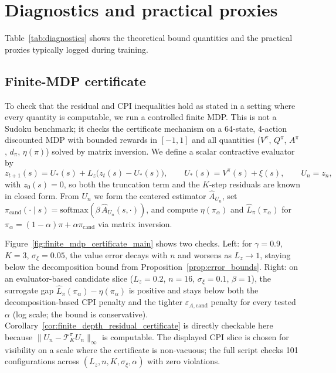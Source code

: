 \documentclass{article}
\theoremstyle{plain}
\theoremstyle{definition}
\theoremstyle{remark}
\begin{document}
\section{Diagnostics and practical proxies}
\label{app:diagnostics}

Table~\ref{tab:diagnostics} shows the theoretical bound quantities and the practical proxies typically logged during training.

\subsection{Finite-MDP certificate}
\label{app:finite_mdp_certificate}

To check that the residual and CPI inequalities hold as stated in a setting where every quantity is computable, we run a controlled finite MDP. This is not a Sudoku benchmark; it checks the certificate mechanism on a 64-state, 4-action discounted MDP with bounded rewards in $[-1,1]$ and all quantities ($V^\pi$, $Q^\pi$, $A^\pi$, $d_\pi$, $\eta(\pi)$) solved by matrix inversion. We define a scalar contractive evaluator by
\[
z_{t+1}(s)=U_*(s)+L_z\bigl(z_t(s)-U_*(s)\bigr),
\qquad
U_*(s)=V^\pi(s)+\xi(s),
\qquad
U_n=z_n,
\]
with $z_0(s)=0$, so both the truncation term and the $K$-step residuals are known in closed form. From $U_n$ we form the centered estimator $\widehat A_{U_n}$, set $\pi_{\mathrm{cand}}(\cdot\mid s)=\mathrm{softmax}(\beta\,\widehat A_{U_n}(s,\cdot))$, and compute $\eta(\pi_\alpha)$ and $\widehat L_\pi(\pi_\alpha)$ for $\pi_\alpha=(1-\alpha)\pi+\alpha\pi_{\mathrm{cand}}$ via matrix inversion.

Figure~\ref{fig:finite_mdp_certificate_main} shows two checks. Left: for $\gamma{=}0.9$, $K{=}3$, $\sigma_\xi{=}0.05$, the value error decays with $n$ and worsens as $L_z\to 1$, staying below the decomposition bound from Proposition~\ref{prop:error_bounds}. Right: on an evaluator-based candidate slice ($L_z{=}0.2$, $n{=}16$, $\sigma_\xi{=}0.1$, $\beta{=}1$), the surrogate gap $\widehat L_\pi(\pi_\alpha)-\eta(\pi_\alpha)$ is positive and stays below both the decomposition-based CPI penalty and the tighter $\varepsilon_{A,\mathrm{cand}}$ penalty for every tested $\alpha$ (log scale; the bound is conservative). Corollary~\ref{cor:finite_depth_residual_certificate} is directly checkable here because $\|U_n-\mathcal{T}^\pi_K U_n\|_\infty$ is computable. The displayed CPI slice is chosen for visibility on a scale where the certificate is non-vacuous; the full script checks 101 configurations across $(L_z,n,K,\sigma_\xi,\alpha)$ with zero violations.
\end{document}
